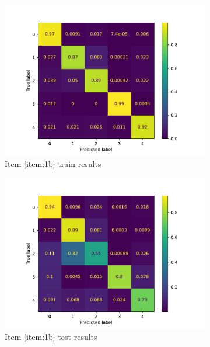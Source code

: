 \documentclass[10pt, a4paper]{article}
\begin{document}
\begin{figure}[htpb]
\begin{subfigure}[b]{0.47\textwidth}
    \centering
    \includegraphics[width=\textwidth]{images/Patch64_imagenet_cm_train.pdf}
    \caption{Item \ref{item:1b} train results}
    \label{fig:q1b_cm_train}
  \end{subfigure}
  \hfill
  \begin{subfigure}[b]{0.47\textwidth}
    \centering
    \includegraphics[width=\textwidth]{images/Patch64_imagenet_cm_test.pdf}
    \caption{Item \ref{item:1b} test results}
    \label{fig:q1b_cm_test}
  \end{subfigure}
  \hfill
  \begin{subfigure}[b]{0.47\textwidth}
    \centering

\end{subfigure}
\end{figure}
\end{document}
